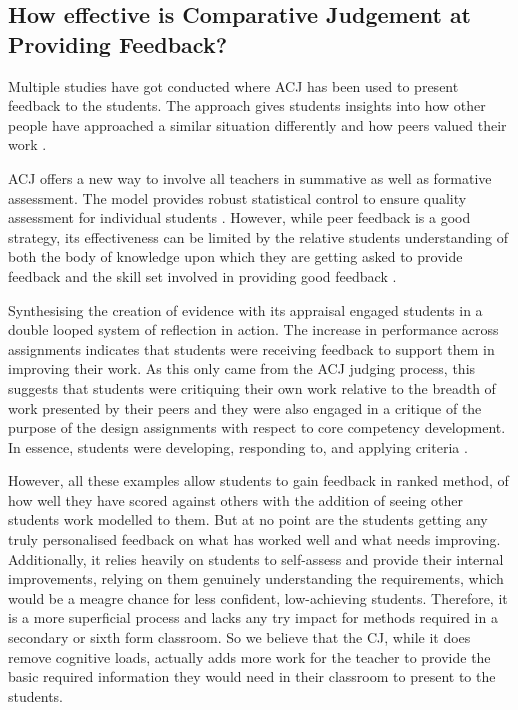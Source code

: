 	\subsection{How effective is Comparative Judgement at Providing Feedback?} %
	Multiple studies have got conducted where ACJ has been used to present feedback to the students. The approach gives students insights into how other people have approached a similar situation differently and how peers valued their work \cite{seery2012validity}. 
	
	ACJ offers a new way to involve all teachers in summative as well as formative assessment. The model provides robust statistical control to ensure quality assessment for individual students \cite{pollitt2012method}. However, while peer feedback is a good strategy, its effectiveness can be limited by the relative students understanding of both the body of knowledge upon which they are getting asked to provide feedback and the skill set involved in providing good feedback \cite{potter2017compair}.
	
	Synthesising the creation of evidence with its appraisal engaged students in a double looped system of reflection in action. The increase in performance across assignments indicates that students were receiving feedback to support them in improving their work. As this only came from the ACJ judging process, this suggests that students were critiquing their own work relative to the breadth of work presented by their peers and they were also engaged in a critique of the purpose of the design assignments with respect to core competency development. In essence, students were developing, responding to, and applying criteria \cite{seery2019integrating}.
	
	However, all these examples allow students to gain feedback in ranked method, of how well they have scored against others with the addition of seeing other students work modelled to them. But at no point are the students getting any truly personalised feedback on what has worked well and what needs improving. Additionally, it relies heavily on students to self-assess and provide their internal improvements, relying on them genuinely understanding the requirements, which would be a meagre chance for less confident, low-achieving students. Therefore, it is a more superficial process and lacks any try impact for methods required in a secondary or sixth form classroom. So we believe that the CJ, while it does remove cognitive loads, actually adds more work for the teacher to provide the basic required information they would need in their classroom to present to the students. 
		
